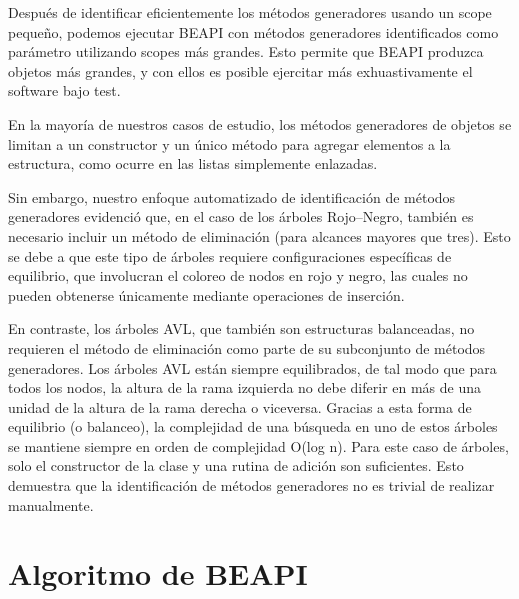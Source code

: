 Después de identificar eficientemente los métodos generadores usando un scope
pequeño, podemos ejecutar \textsf{BEAPI} con métodos generadores identificados
como parámetro utilizando scopes más grandes. Esto permite que \textsf{BEAPI}
produzca objetos más grandes, y con ellos es posible ejercitar más exhuastivamente 
el software bajo test.


En la mayoría de nuestros casos de estudio, los métodos generadores de objetos se limitan a un 
constructor y un único método para agregar elementos a la estructura, como ocurre en las listas 
simplemente enlazadas.  

Sin embargo, nuestro enfoque automatizado de identificación de métodos generadores evidenció que, 
en el caso de los árboles Rojo–Negro, también es necesario incluir un método de eliminación 
(para alcances mayores que tres).  
Esto se debe a que este tipo de árboles requiere configuraciones específicas de equilibrio, 
que involucran el coloreo de nodos en rojo y negro, las cuales no pueden obtenerse únicamente 
mediante operaciones de inserción.

En contraste, los árboles AVL,
que también son estructuras balanceadas, no requieren el método de eliminación como parte de su subconjunto de métodos generadores.
Los árboles AVL están siempre equilibrados, 
de tal modo que para todos los nodos, la altura de la rama izquierda no debe diferir en más de una unidad de la altura de la rama derecha o viceversa. 
Gracias a esta forma de equilibrio (o balanceo), la complejidad de una búsqueda en uno de estos árboles se mantiene siempre en orden de complejidad O(log n). 
Para este caso de árboles, solo el constructor de la clase y una rutina de adición son suficientes. 
Esto demuestra que la identificación de métodos generadores no es trivial de realizar manualmente.


\section{Algoritmo de BEAPI}
\label{sec:beapiTechnique}


